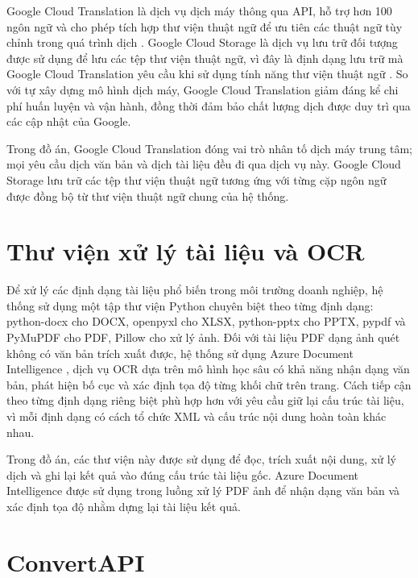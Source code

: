 \documentclass[../DoAn.tex]{subfiles}
\begin{document}
Google Cloud Translation là dịch vụ dịch máy thông qua API, hỗ trợ hơn 100 ngôn ngữ và cho phép tích hợp thư viện thuật ngữ để ưu tiên các thuật ngữ tùy chỉnh trong quá trình dịch \cite{google-cloud-translation}. Google Cloud Storage là dịch vụ lưu trữ đối tượng được sử dụng để lưu các tệp thư viện thuật ngữ, vì đây là định dạng lưu trữ mà Google Cloud Translation yêu cầu khi sử dụng tính năng thư viện thuật ngữ \cite{google-cloud-storage}. So với tự xây dựng mô hình dịch máy, Google Cloud Translation giảm đáng kể chi phí huấn luyện và vận hành, đồng thời đảm bảo chất lượng dịch được duy trì qua các cập nhật của Google.

Trong đồ án, Google Cloud Translation đóng vai trò nhân tố dịch máy trung tâm; mọi yêu cầu dịch văn bản và dịch tài liệu đều đi qua dịch vụ này. Google Cloud Storage lưu trữ các tệp thư viện thuật ngữ tương ứng với từng cặp ngôn ngữ được đồng bộ từ thư viện thuật ngữ chung của hệ thống.

\section{Thư viện xử lý tài liệu và OCR}
\label{section:3.6}

Để xử lý các định dạng tài liệu phổ biến trong môi trường doanh nghiệp, hệ thống sử dụng một tập thư viện Python chuyên biệt theo từng định dạng: python-docx \cite{python-docx} cho DOCX, openpyxl \cite{openpyxl} cho XLSX, python-pptx \cite{python-pptx} cho PPTX, pypdf và PyMuPDF \cite{pymupdf} cho PDF, Pillow cho xử lý ảnh. Đối với tài liệu PDF dạng ảnh quét không có văn bản trích xuất được, hệ thống sử dụng Azure Document Intelligence \cite{azure-document-intelligence}, dịch vụ OCR dựa trên mô hình học sâu có khả năng nhận dạng văn bản, phát hiện bố cục và xác định tọa độ từng khối chữ trên trang. Cách tiếp cận theo từng định dạng riêng biệt phù hợp hơn với yêu cầu giữ lại cấu trúc tài liệu, vì mỗi định dạng có cách tổ chức XML và cấu trúc nội dung hoàn toàn khác nhau.

Trong đồ án, các thư viện này được sử dụng để đọc, trích xuất nội dung, xử lý dịch và ghi lại kết quả vào đúng cấu trúc tài liệu gốc. Azure Document Intelligence được sử dụng trong luồng xử lý PDF ảnh để nhận dạng văn bản và xác định tọa độ nhằm dựng lại tài liệu kết quả.

\section{ConvertAPI}
\label{section:3.7}
\end{document}
